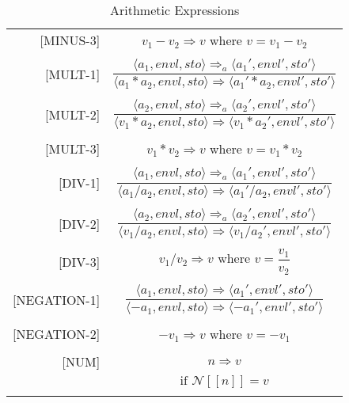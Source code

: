 \begin{longtable}[c] { r c }
  [MINUS-3] & 
    \( v_1 - v_2 \Rightarrow v \) where \( v = v_1 - v_2\) \\
  & \\

  [MULT-1] & 
    \( \dfrac { \langle a_1, envl, sto \rangle \Rightarrow_a \langle a_1', envl', sto' \rangle }
      {\langle a_1 * a_2, envl, sto \rangle \Rightarrow \langle a_1' * a_2, envl', sto' \rangle } \) \\
  & \\

  [MULT-2] & 
    \( \dfrac { \langle a_2, envl, sto \rangle \Rightarrow_a \langle a_2', envl', sto' \rangle }
      {\langle v_1 * a_2, envl, sto \rangle \Rightarrow \langle v_1 * a_2', envl', sto' \rangle } \) \\
  & \\

  [MULT-3] & 
    \( v_1 * v_2 \Rightarrow v \) where \( v = v_1 * v_2\) \\
  & \\

  [DIV-1] & 
    \( \dfrac { \langle a_1, envl, sto \rangle \Rightarrow_a \langle a_1', envl', sto' \rangle }
      {\langle a_1 / a_2, envl, sto \rangle \Rightarrow \langle a_1' / a_2, envl', sto' \rangle } \) \\
  & \\

  [DIV-2] & 
    \( \dfrac { \langle a_2, envl, sto \rangle \Rightarrow_a \langle a_2', envl', sto' \rangle }
      {\langle v_1 / a_2, envl, sto \rangle \Rightarrow \langle v_1 / a_2', envl', sto' \rangle } \) \\
  & \\

  [DIV-3] & 
    \( v_1 / v_2 \Rightarrow v \) where \( v = \dfrac{ v_1 }{ v_2 } \) \\
  & \\

  [NEGATION-1] & 
    \( \dfrac { \langle a_1, envl, sto \rangle \Rightarrow \langle a_1', envl', sto' \rangle }
      {\langle -a_1, envl, sto \rangle \Rightarrow \langle -a_1', envl', sto' \rangle } \) \\
  & \\

  [NEGATION-2] & 
    \( -v_1 \Rightarrow v \) where \( v = -v_1 \)\\
  & \\

  [NUM] & 
    \( n \Rightarrow v \) \\
  & \( \text{if } \mathcal{N} [[n]] = v \) \\

  \caption{Arithmetic Expressions}
\end{longtable}

